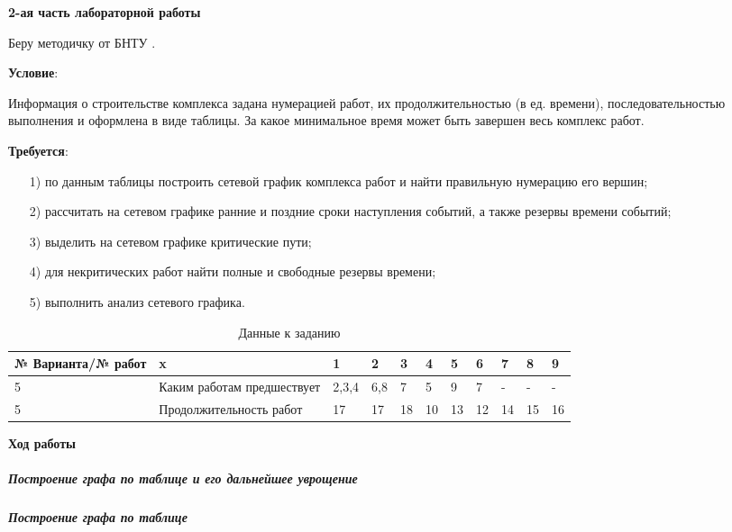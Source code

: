 \begin{center}
  \textbf{2-ая часть лабораторной работы}
\end{center}

Беру методичку от БНТУ \cite{MethodBntu}.

\textbf{Условие}: 

Информация о строительстве комплекса задана нумерацией работ,
их продолжительностью (в ед. времени),
последовательностью выполнения и оформлена в виде таблицы.
За какое минимальное время может быть завершен весь комплекс работ.

\textbf{Требуется}:
\begin{enumerate}
  \item[1)] по данным таблицы построить сетевой график комплекса работ и найти правильную нумерацию его вершин;
  \item[2)] рассчитать на сетевом графике ранние и поздние сроки наступления событий, а также резервы времени событий;
  \item[3)] выделить на сетевом графике критические пути;
  \item[4)] для некритических работ найти полные и свободные резервы времени;
  \item[5)] выполнить анализ сетевого графика.
\end{enumerate}

\begin{table}[h!]
  \centering

  \caption{Данные к заданию}
  \label{tab:part2_option5}

  \begin{tabular}{|l|l|l|l|l|l|l|l|l|l|l|} 
    \hline
    № Варианта/№ работ &x&1&2&3&4&5&6&7&8&9\\  \hline
    5&Каким работам предшествует&2,3,4&6,8&7&5&9&7&-&-&-\\ \hline
    5&Продолжительность работ&17&17&18&10&13&12&14&15&16\\  \hline
  \end{tabular}
\end{table}

\begin{center}
  \textbf{Ход работы}
\end{center}

\subparagraph{Построение графа по таблице и его дальнейшее уврощение} \hspace{0pt}

\subparagraph{Построение графа по таблице} \hspace{0pt}

